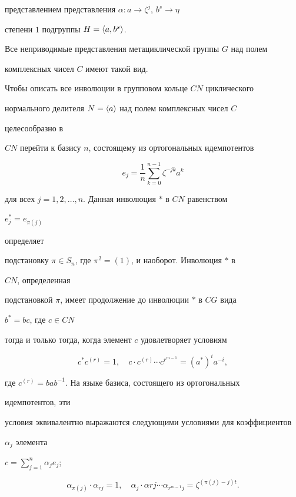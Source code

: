 представлением представления $\alpha:a\to\zeta^j$, $b^s\to \eta$


степени $1$ подгруппы $H=\langle a,b^s\rangle$.


Все неприводимые представления метациклической группы $G$ над полем


комплексных чисел $C$ имеют такой вид.





Чтобы описать все инволюции в групповом кольце $CN$ циклического


нормального делителя $N=\langle a\rangle$ над полем комплексных чисел $C$


целесообразно в


$CN$ перейти к базису $n$, состоящему из ортогональных идемпотентов


$$


e_j=\frac{1}{n}\sum^{n-1}_{k=0}\zeta^{-jk}a^k


$$


для всех $j=1,2,\dotsc,n$. Данная инволюция $*$ в $CN$ равенством


$e^*_j =e_{\pi(j)}$


определяет


подстановку $\pi\in S_n$, где $\pi^2=(1)$, и наоборот. Инволюция $*$ в


$CN$, определенная


подстановкой $\pi$, имеет продолжение до инволюции $*$ в $CG$ вида


$b^*=bc$, где $c\in CN$


тогда и только тогда, когда элемент $c$ удовлетворяет условиям


\begin{equation}


c^*c^{(r)}=1, \quad c\cdot c^{(r)}\dotsb c^{r^{m-1}}=(a^*)^ia^{-i},


\end{equation}


где $c^{(r)}=bab^{-1}$. На языке базиса, состоящего из ортогональных


идемпотентов, эти


условия эквивалентно выражаются следующими условиями для коэффициентов


$\alpha_j$ элемента


$c=\sum\limits^n_{j=1}\alpha_j e_j$;


\begin{equation}


\alpha_{\pi(j)}\cdot \alpha_{rj}=1,\quad


\alpha_j\cdot\alpha rj\dotsb\alpha_{r^{m-1}j}=


\zeta^{(\pi(j)-j)t}.


\end{equation}





